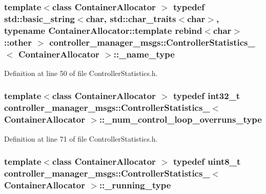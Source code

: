 \subsubsection[{\-\_\-name\-\_\-type}]{\setlength{\rightskip}{0pt plus 5cm}template$<$class Container\-Allocator $>$ typedef std\-::basic\-\_\-string$<$char, std\-::char\-\_\-traits$<$char$>$, typename \-Container\-Allocator\-::template rebind$<$char$>$\-::other $>$ {\bf controller\-\_\-manager\-\_\-msgs\-::\-Controller\-Statistics\-\_\-}$<$ \-Container\-Allocator $>$\-::{\bf \-\_\-name\-\_\-type}}\label{structcontroller__manager__msgs_1_1ControllerStatistics___a7f3e00ba63c9a6ae6af54b2bb2acda88}


\-Definition at line 50 of file \-Controller\-Statistics.\-h.

\subsubsection[{\-\_\-num\-\_\-control\-\_\-loop\-\_\-overruns\-\_\-type}]{\setlength{\rightskip}{0pt plus 5cm}template$<$class Container\-Allocator $>$ typedef int32\-\_\-t {\bf controller\-\_\-manager\-\_\-msgs\-::\-Controller\-Statistics\-\_\-}$<$ \-Container\-Allocator $>$\-::{\bf \-\_\-num\-\_\-control\-\_\-loop\-\_\-overruns\-\_\-type}}\label{structcontroller__manager__msgs_1_1ControllerStatistics___a11e56e515bdb981022e80dab48aad099}


\-Definition at line 71 of file \-Controller\-Statistics.\-h.

\subsubsection[{\-\_\-running\-\_\-type}]{\setlength{\rightskip}{0pt plus 5cm}template$<$class Container\-Allocator $>$ typedef uint8\-\_\-t {\bf controller\-\_\-manager\-\_\-msgs\-::\-Controller\-Statistics\-\_\-}$<$ \-Container\-Allocator $>$\-::{\bf \-\_\-running\-\_\-type}}\label{structcontroller__manager__msgs_1_1ControllerStatistics___aa3740d2f815229165f3be0a634024250}


